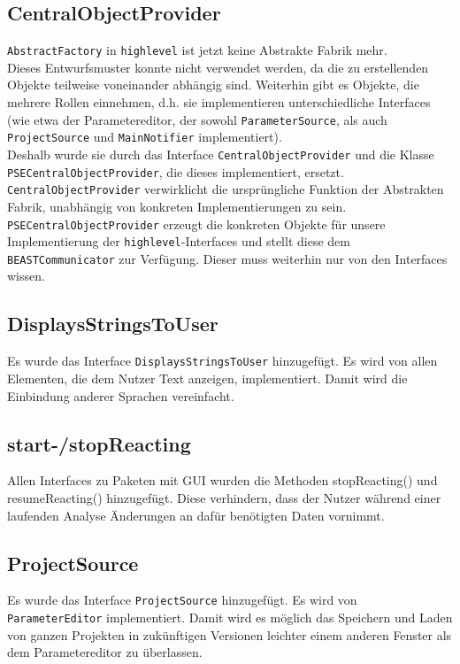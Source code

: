 \documentclass[a4paper]{scrreprt}
\begin{document}
\subsection{CentralObjectProvider}
\verb!AbstractFactory! in \verb!highlevel! ist jetzt keine Abstrakte Fabrik mehr.\\ Dieses Entwurfsmuster konnte nicht verwendet werden, da die zu erstellenden Objekte teilweise voneinander abhängig sind. Weiterhin gibt es Objekte, die mehrere Rollen einnehmen, d.h. sie implementieren unterschiedliche Interfaces (wie etwa der Parametereditor, der sowohl \verb!ParameterSource!, als auch \verb!ProjectSource! und \verb!MainNotifier! implementiert). \\
Deshalb wurde sie durch das Interface \verb!CentralObjectProvider! und die Klasse \verb!PSECentralObjectProvider!, die dieses implementiert, ersetzt. \verb!CentralObjectProvider! verwirklicht die ursprüngliche Funktion der Abstrakten Fabrik, unabhängig von konkreten Implementierungen zu sein. \\
\verb!PSECentralObjectProvider! erzeugt die konkreten Objekte für unsere Implementierung der \verb!highlevel!-Interfaces und stellt diese dem \verb!BEASTCommunicator! zur Verfügung. Dieser muss weiterhin nur von den Interfaces wissen. \\

\subsection{DisplaysStringsToUser}
Es wurde das Interface \verb!DisplaysStringsToUser! hinzugefügt. Es wird von allen Elementen, die dem Nutzer Text anzeigen, implementiert. Damit wird die Einbindung anderer Sprachen vereinfacht. \\

\subsection{start-/stopReacting}
Allen Interfaces zu Paketen mit GUI wurden die Methoden stopReacting() und resumeReacting() hinzugefügt. Diese verhindern, dass der Nutzer während einer laufenden Analyse Änderungen an dafür benötigten Daten vornimmt. \\

\subsection{ProjectSource}
Es wurde das Interface \verb!ProjectSource! hinzugefügt. Es wird von \verb!ParameterEditor! implementiert. Damit wird es möglich das Speichern und Laden von ganzen Projekten in zukünftigen Versionen leichter einem anderen Fenster als dem Parametereditor zu überlassen. \\
\end{document}
